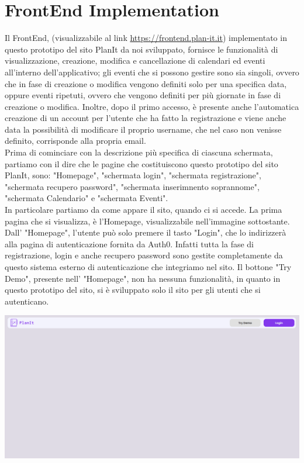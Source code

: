 \section{FrontEnd Implementation}
\label{secD4:FrontEndImplementation}
Il FrontEnd, (visualizzabile al link \href{https://frontend.plan-it.it} {https://frontend.plan-it.it}) implementato in questo prototipo del sito PlanIt da noi sviluppato, fornisce le funzionalità di visualizzazione, creazione, modifica e cancellazione di calendari ed eventi all'interno dell'applicativo; gli eventi che si possono gestire sono sia singoli, ovvero che in fase di creazione o modifica vengono definiti solo per una specifica data, oppure eventi ripetuti, ovvero che vengono definiti per più giornate in fase di creazione o modifica. Inoltre, dopo il primo accesso, è presente anche l'automatica creazione di un account per l'utente che ha fatto la registrazione e viene anche data la possibilità di modificare il proprio username, che nel caso non venisse definito, corrisponde alla propria email. \\ Prima di cominciare con la descrizione più specifica di ciascuna schermata, partiamo con il dire che le pagine che costituiscono questo prototipo del sito PlanIt, sono: "Homepage", "schermata login", "schermata registrazione", "schermata recupero password", "schermata inserimnento soprannome", "schermata Calendario" e "schermata Eventi".
\\ In particolare partiamo da come appare il sito, quando ci si accede. La prima pagina che si visualizza, è l'Homepage, visualizzabile nell'immagine sottostante. Dall' "Homepage", l'utente può solo premere il tasto "Login", che lo indirizzerà alla pagina di autenticazione fornita da Auth0. Infatti tutta la fase di registrazione, login e anche recupero password sono gestite completamente da questo sistema esterno di autenticazione che integriamo nel sito. Il bottone "Try Demo", presente nell' "Homepage", non ha nessuna funzionalità, in quanto in questo prototipo del sito, si è sviluppato solo il sito per gli utenti che si autenticano.
\begin{center}
    \includegraphics[width=1\textwidth, height=0.3\textheight]{img/png/FrontEnd/Homepage_Autenticazione/Homepage.png}
\end{center}
